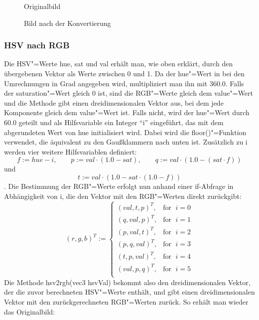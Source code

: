 \documentclass[a4paper,12pt,abstracton,titlepage]{scrartcl}
\begin{document}
\begin{figure}[htbp]
\begin{minipage}[t]{0.48\textwidth}
  \begin{center}
    \caption{Originalbild}
    \label{originalScot}
  \end{center}
\end{minipage}
\begin{minipage}[t]{0.52\textwidth}
  \begin{center}
    \caption{Bild nach der Konvertierung}
    \label{rgb2hsv}
  \end{center}
\end{minipage}
\end{figure}


\subsubsection{HSV nach RGB}
Die HSV"=Werte hue, sat und val erhält man, wie oben erklärt, durch den übergebenen Vektor als Werte zwischen 0 und 1. Da der hue"=Wert in bei den Umrechnungen in Grad angegeben wird, multipliziert man ihn mit 360.0. Falls der saturation"=Wert gleich 0 ist, sind die RGB"=Werte gleich dem value"=Wert und die Methode gibt einen dreidimensionalen Vektor aus, bei dem jede Komponente gleich dem value"=Wert ist. Falls nicht, wird der hue"=Wert durch 60.0 geteilt und als Hilfsvariable ein Integer "`i"' eingeführt, das mit dem abgerundeten Wert von hue initialisiert wird. Dabei wird die floor()"=Funktion verwendet, die äquivalent zu den Gaußklammern nach unten ist. Zusätzlich zu i werden vier weitere Hilfsvariablen definiert: \[f := hue - i,\qquad p := val \cdot (1.0 - sat),\qquad q := val \cdot (1.0 - (sat \cdot f))\] und \[t := val \cdot (1.0 - sat \cdot (1.0 - f))\].
Die Bestimmung der RGB"=Werte erfolgt nun anhand einer if-Abfrage in Abhängigkeit von i, die den Vektor mit den RGB"=Werten direkt zurückgibt:
\[
  (r,g,b)^T := \left\{\begin{array}{lr}
        (val,t,p)^T, & \text{for }\; i = 0\\
        (q,val,p)^T, & \text{for }\; i = 1\\
        (p,val,t)^T, & \text{for }\; i = 2\\
        (p,q,val)^T, & \text{for }\; i = 3\\
        (t,p,val)^T, & \text{for }\; i = 4\\
        (val,p,q)^T, & \text{for }\; i = 5\\
        \end{array}\right.
  \]
Die Methode hsv2rgb(vec3 hsvVal) bekommt also den dreidimensionalen Vektor, der die zuvor berechneten HSV"=Werte enthält, und gibt einen dreidimensionalen Vektor mit den zurückgerechneten RGB"=Werten zurück. So erhält man wieder das Originalbild:
\end{document}

